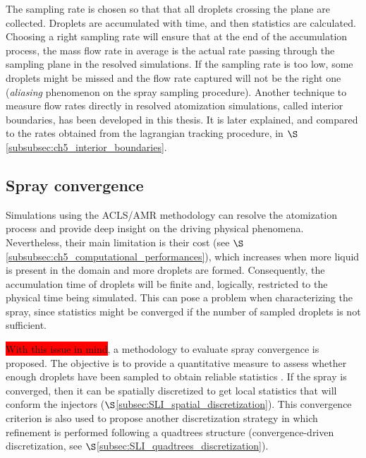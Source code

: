 The sampling rate is chosen so that that all droplets crossing the plane are collected. Droplets are accumulated with time, and then statistics are calculated. Choosing a right sampling rate will ensure that at the end of the accumulation process, the mass flow rate in average is the actual rate passing through the sampling plane in the resolved simulations. If the sampling rate is too low, some droplets might be missed and the flow rate captured will not be the right one (\textit{aliasing} phenomenon on the spray sampling procedure). Another technique to measure flow rates directly in resolved atomization simulations, called interior boundaries, has been developed in this thesis. It is later explained, and compared to the rates obtained from the lagrangian tracking procedure, in $\S$\ref{subsubsec:ch5_interior_boundaries}.


\subsection{Spray convergence}
\label{subsec:SLI_spray_convergence}

Simulations using the ACLS/AMR methodology can resolve the atomization process and provide deep insight on the driving physical phenomena. Nevertheless, their main limitation is their cost (see $\S$\ref{subsubsec:ch5_computational_performances}), which increases when more liquid is present in the domain and more droplets are formed. Consequently, the accumulation time of droplets will be finite and, logically, restricted to the physical time being simulated. This can pose a problem when characterizing the spray, since statistics might be converged if the number of sampled droplets is not sufficient.

\colorbox{red}{With this issue in mind}, a methodology to evaluate spray convergence is proposed. The objective is to provide a quantitative measure to assess whether enough droplets have been sampled to obtain reliable statistics . If the spray is converged, then it can be spatially discretized to get local statistics that will conform the injectors ($\S$\ref{subsec:SLI_spatial_discretization}). This convergence criterion is also used to propose another discretization strategy in which refinement is performed following a quadtrees structure (convergence-driven discretization, see $\S$\ref{subsec:SLI_quadtrees_discretization}).

